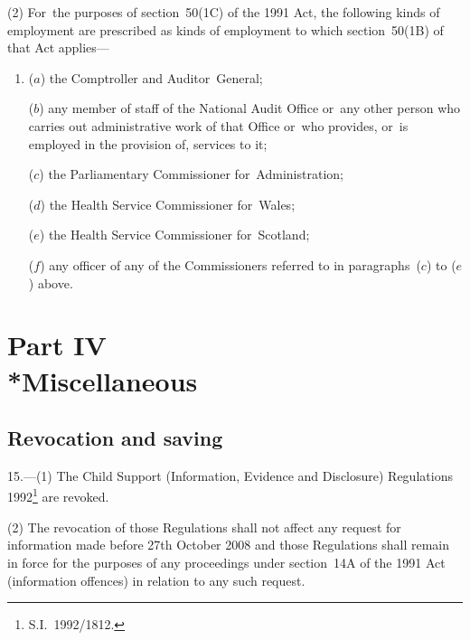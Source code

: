 \documentclass[12pt,a4paper]{article}
\begin{document}
(2) For~the purposes of section~50(1C) of the 1991 Act, the following kinds of employment are prescribed as kinds of employment to which section~50(1B) of that Act applies—
\begin{enumerate}\item[]
($a$) the Comptroller and Auditor~General;

($b$) any member of staff of the National Audit Office or~any other person who carries out administrative work of that Office or~who provides, or~is employed in the provision of, services to it;

($c$) the Parliamentary Commissioner for~Administration;

($d$) the Health Service Commissioner for~Wales;

($e$) the Health Service Commissioner for~Scotland;

($f$) any officer of any of the Commissioners referred to in paragraphs~($c$)  to ($e$)    above.
\end{enumerate}


\section[Part IV --- Miscellaneous]{Part IV\\*Miscellaneous}

\renewcommand\parthead{--- Part~IV}

\subsection[15. Revocation and saving]{Revocation and saving}

15.---(1)  The Child Support (Information, Evidence and Disclosure) Regulations 1992\footnote{S.I.~1992/1812.} are revoked.

(2) The revocation of those Regulations shall not affect any request for information made before 27th October 2008 and those Regulations shall remain in force for the purposes of any proceedings under section~14A of the 1991 Act (information offences) in relation to any such request.


%
\end{document}
